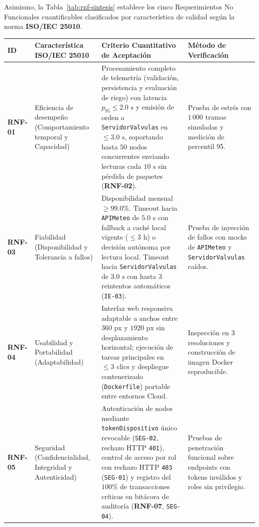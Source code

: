 \documentclass[12pt,letterpaper]{report}
\begin{document}
Asimismo, la Tabla~\ref{tab:rnf-sintesis} establece los cinco Requerimientos No Funcionales cuantificables clasificados por característica de calidad según la norma \textbf{ISO/IEC 25010}.

\begin{table}[H]
    \centering
    \small
    \renewcommand{\arraystretch}{1.3}
    \begin{tabularx}{\linewidth}{|L{1.4cm}|L{3.1cm}|Y|L{3.2cm}|}
        \hline
        \textbf{ID} & \textbf{Característica ISO/IEC 25010} & \textbf{Criterio Cuantitativo de Aceptación} & \textbf{Método de Verificación} \\
        \hline
        \textbf{RNF-01} & Eficiencia de desempeño (Comportamiento temporal y Capacidad) & Procesamiento completo de telemetría (validación, persistencia y evaluación de riego) con latencia $p_{95} \le 2.0\text{ s}$ y emisión de orden a \texttt{ServidorValvulas} en $\le 3.0\text{ s}$, soportando hasta $50$ nodos concurrentes enviando lecturas cada $10\text{ s}$ sin pérdida de paquetes (\textbf{RNF-02}). & Prueba de estrés con $1\,000$ tramas simuladas y medición de percentil 95. \\
        \hline
        \textbf{RNF-03} & Fiabilidad (Disponibilidad y Tolerancia a fallos) & Disponibilidad mensual $\ge 99.0\%$. Timeout hacia \texttt{APIMeteo} de $5.0\text{ s}$ con fallback a caché local vigente ($\le 3\text{ h}$) o decisión autónoma por lectura local. Timeout hacia \texttt{ServidorValvulas} de $3.0\text{ s}$ con hasta $3$ reintentos automáticos (\texttt{IE-03}). & Prueba de inyección de fallos con mocks de \texttt{APIMeteo} y \texttt{ServidorValvulas} caídos. \\
        \hline
        \textbf{RNF-04} & Usabilidad y Portabilidad (Adaptabilidad) & Interfaz web responsiva adaptable a anchos entre $360\text{ px}$ y $1920\text{ px}$ sin desplazamiento horizontal; ejecución de tareas principales en $\le 3\text{ clics}$ y despliegue contenerizado (\texttt{Dockerfile}) portable entre entornos Cloud. & Inspección en 3 resoluciones y construcción de imagen Docker reproducible. \\
        \hline
        \textbf{RNF-05} & Seguridad (Confidencialidad, Integridad y Autenticidad) & Autenticación de nodos mediante \texttt{tokenDispositivo} único revocable (\texttt{SEG-02}, rechazo HTTP \texttt{401}), control de acceso por rol con rechazo HTTP \texttt{403} (\texttt{SEG-01}) y registro del $100\%$ de transacciones críticas en bitácora de auditoría (\textbf{RNF-07}, \texttt{SEG-04}). & Pruebas de penetración funcional sobre endpoints con tokens inválidos y roles sin privilegio. \\

\end{tabularx}
\end{table}
\end{document}

